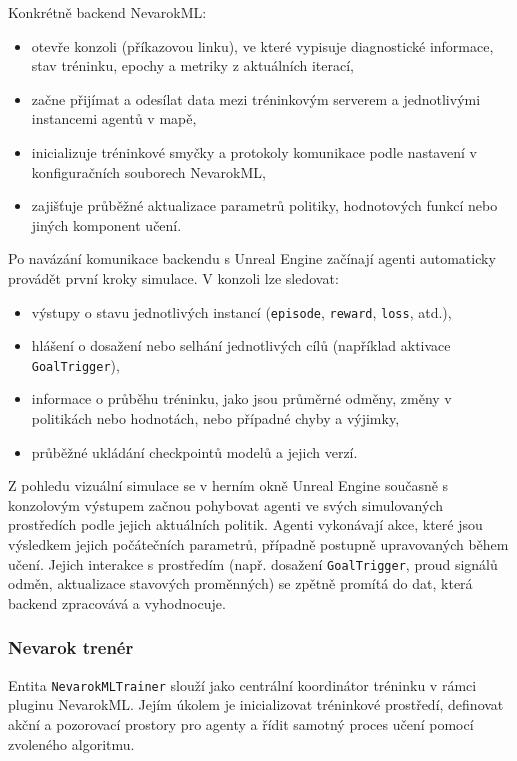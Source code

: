 Konkrétně backend NevarokML:

\begin{itemize}
	\item otevře konzoli (příkazovou linku), ve které vypisuje diagnostické informace, stav tréninku, epochy a metriky z aktuálních iterací,
	\item začne přijímat a odesílat data mezi tréninkovým serverem a jednotlivými instancemi agentů v mapě,
	\item inicializuje tréninkové smyčky a protokoly komunikace podle nastavení v konfiguračních souborech NevarokML,
	\item zajišťuje průběžné aktualizace parametrů politiky, hodnotových funkcí nebo jiných komponent učení.
\end{itemize}

Po navázání komunikace backendu s Unreal Engine začínají agenti automaticky provádět první kroky simulace. V konzoli lze sledovat:

\begin{itemize}
	\item výstupy o stavu jednotlivých instancí (\texttt{episode}, \texttt{reward}, \texttt{loss}, atd.),
	\item hlášení o dosažení nebo selhání jednotlivých cílů (například aktivace \texttt{GoalTrigger}),
	\item informace o průběhu tréninku, jako jsou průměrné odměny, změny v politikách nebo hodnotách, nebo případné chyby a výjimky,
	\item průběžné ukládání checkpointů modelů a jejich verzí.
\end{itemize}

Z pohledu vizuální simulace se v herním okně Unreal Engine současně s konzolovým výstupem začnou pohybovat agenti ve svých simulovaných prostředích podle jejich aktuálních politik. Agenti vykonávají akce, které jsou výsledkem jejich počátečních parametrů, případně postupně upravovaných během učení. Jejich interakce s prostředím (např. dosažení \texttt{GoalTrigger}, proud signálů odměn, aktualizace stavových proměnných) se zpětně promítá do dat, která backend zpracovává a vyhodnocuje.

\subsubsection{Nevarok trenér}

Entita \texttt{NevarokMLTrainer} slouží jako centrální koordinátor tréninku v rámci pluginu NevarokML. Jejím úkolem je inicializovat tréninkové prostředí, definovat akční a pozorovací prostory pro agenty a řídit samotný proces učení pomocí zvoleného algoritmu.

